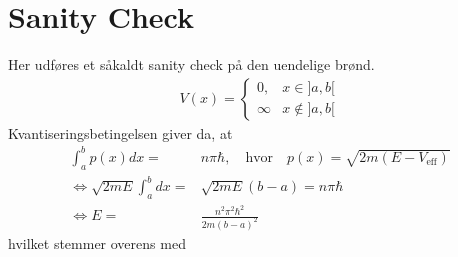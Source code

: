 \section{Sanity Check}
Her udføres et såkaldt sanity check på den uendelige brønd.
\begin{align}
    V(x) =
    \begin{cases}
    0, & x\in]a, b[ \\
    \infty & x\notin]a, b[
    \end{cases}
    \label{pot}
\end{align}
Kvantiseringsbetingelsen giver da, at
\begin{align}
    \int_{a}^{b} p(x) dx = & n\pi \hbar, \quad \text{hvor} \quad p(x) = \sqrt{2m(E-V_{\text{eff}})}\\
    \Leftrightarrow \sqrt{2mE}\int_{a}^{b} dx = & \sqrt{2mE}(b-a) = n\pi \hbar\\
    \Leftrightarrow E = & \frac{n^{2}\pi^{2}\hbar^{2}}{2m(b-a)^{2}}
    \label{ja}
\end{align}
hvilket stemmer overens med \cite[s. 30]{griffiths}

